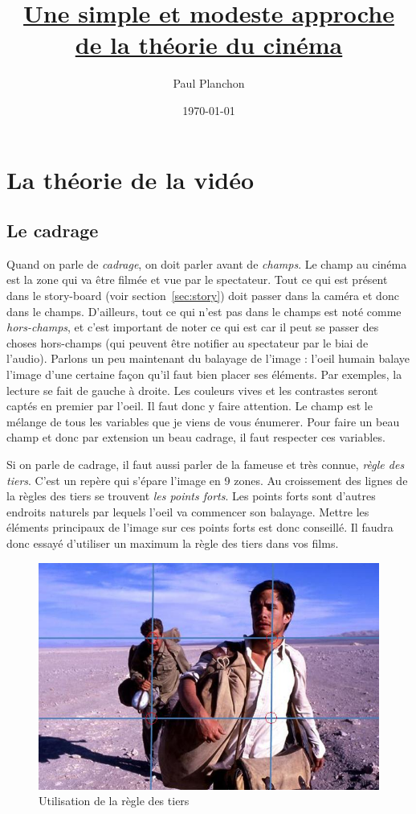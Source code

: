 \documentclass{article}
\title{\uline{Une simple et modeste approche de la théorie du cinéma}}
\author{Paul Planchon}
\date{\today}
\begin{document}
\maketitle
\tableofcontents
\newpage

\section{La théorie de la vidéo}
	\subsection{Le cadrage}
Quand on parle de \textit{cadrage}, on doit parler  avant de \textit{champs}. Le champ au cinéma est la zone qui va être filmée et vue par le spectateur. Tout ce qui est présent dans le story-board (voir section~\ref{sec:story}) doit passer dans la caméra et donc dans le champs. D'ailleurs, tout ce qui n'est pas dans le champs est noté comme \textit{hors-champs}, et c'est important de noter ce qui est car il peut se passer des choses hors-champs (qui peuvent être notifier au spectateur par le biai de l'audio). Parlons un peu maintenant du balayage de l'image : l'oeil humain balaye l'image d'une certaine façon qu'il faut bien placer ses éléments. Par exemples, la lecture se fait de gauche à droite. Les couleurs vives et les contrastes seront captés en premier par l'oeil. Il faut donc y faire attention. Le champ est le mélange de tous les variables que je viens de vous énumerer. Pour faire un beau champ et donc par extension un beau cadrage, il faut respecter ces variables. 

\medskip

Si on parle de cadrage, il faut aussi parler de la fameuse et très connue, \textit{règle des tiers}. C'est un repère qui s'épare l'image en 9 zones. Au croissement des lignes de la règles des tiers se trouvent \textit{les points forts}. Les points forts sont d'autres endroits naturels par lequels l'oeil va commencer son balayage. Mettre les éléments principaux de l'image sur ces points forts est donc conseillé. Il faudra donc essayé d'utiliser un maximum la règle des tiers dans vos films. 

\begin{figure}[h]
\centering
\includegraphics[scale=0.2]{img/image1.png}
\caption{Utilisation de la règle des tiers}
\label{fig:regle_tiers}
\end{figure}
\end{document}
